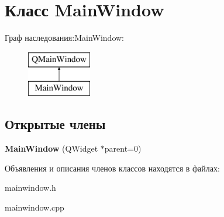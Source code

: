 \hypertarget{class_main_window}{}\section{Класс Main\+Window}
\label{class_main_window}
Граф наследования\+:Main\+Window\+:\begin{figure}[H]
\begin{center}
\leavevmode
\includegraphics[height=2.000000cm]{class_main_window}
\end{center}
\end{figure}
\subsection*{Открытые члены}
\begin{DoxyCompactItemize}
\item 
{\bfseries Main\+Window} (Q\+Widget $\ast$parent=0)\hypertarget{class_main_window_a8b244be8b7b7db1b08de2a2acb9409db}{}\label{class_main_window_a8b244be8b7b7db1b08de2a2acb9409db}

\end{DoxyCompactItemize}


Объявления и описания членов классов находятся в файлах\+:\begin{DoxyCompactItemize}
\item 
mainwindow.\+h\item 
mainwindow.\+cpp\end{DoxyCompactItemize}
